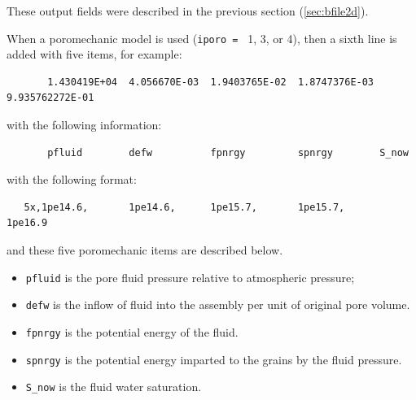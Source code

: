 \documentclass[letterpaper,11pt]{article}
\begin{document}
\normalsize
\par\noindent
\rule{0ex}{3ex}These output fields were described in the previous section
(\ref{sec:bfile2d}).
\par
When a poromechanic model is used (\texttt{iporo = } 1, 3, or 4),
then a sixth line is added with five items, for example:\\[-2ex]
\begin{verbatim}
       1.430419E+04  4.056670E-03  1.9403765E-02  1.8747376E-03 9.935762272E-01
\end{verbatim}
\par\noindent
\rule{0ex}{3ex}with the following information:\\[-2ex]
\begin{verbatim}
       pfluid        defw          fpnrgy         spnrgy        S_now
\end{verbatim}
\par\noindent
\rule{0ex}{3ex}with the following format:\\[-2ex]
\begin{verbatim}
   5x,1pe14.6,       1pe14.6,      1pe15.7,       1pe15.7,      1pe16.9
\end{verbatim}
\par\noindent
\rule{0ex}{3ex}and these five poromechanic items are described below.
%
\begin{itemize}
\item
\texttt{pfluid} is the pore fluid pressure relative to atmospheric pressure;
\item
\texttt{defw} is the inflow of fluid into the assembly
per unit of original pore volume.
\item
\texttt{fpnrgy} is the potential energy of the fluid.
\item
\texttt{spnrgy} is the potential energy imparted to the
grains by the fluid pressure.
\item
\texttt{S\_now} is the fluid water saturation.
\end{itemize}
%
\end{document}
